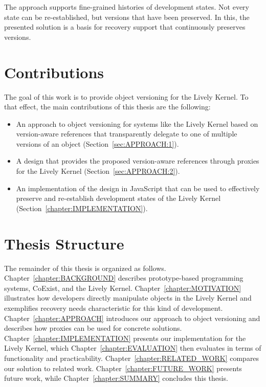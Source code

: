 The approach supports fine-grained histories of development states.
Not every state can be re-established, but versions that have been preserved.
In this, the presented solution is a basis for recovery support that continuously preserves versions.

\section{Contributions}

The goal of this work is to provide object versioning for the Lively Kernel.
To that effect, the main contributions of this thesis are the following:

\begin{itemize}
    \item An approach to object versioning for systems like the Lively Kernel based on version-aware references that transparently delegate to one of multiple versions of an object (Section~\ref{sec:APPROACH:1}).
    \item A design that provides the proposed version-aware references through proxies for the Lively Kernel (Section~\ref{sec:APPROACH:2}).
    \item An implementation of the design in JavaScript that can be used to effectively preserve and re-establish development states of the Lively Kernel (Section~\ref{chapter:IMPLEMENTATION}).
\end{itemize}


\section{Thesis Structure}

The remainder of this thesis is organized as follows. 
Chapter~\ref{chapter:BACKGROUND} describes prototype-based programming systems, CoExist, and the Lively Kernel.
Chapter~\ref{chapter:MOTIVATION} illustrates how developers directly manipulate objects in the Lively Kernel and exemplifies recovery needs characteristic for this kind of development.
Chapter~\ref{chapter:APPROACH} introduces our approach to object versioning and describes how proxies can be used for concrete solutions.
Chapter~\ref{chapter:IMPLEMENTATION} presents our implementation for the Lively Kernel, which Chapter~\ref{chapter:EVALUATION} then evaluates in terms of functionality and practicability.
Chapter~\ref{chapter:RELATED_WORK} compares our solution to related work.
Chapter~\ref{chapter:FUTURE_WORK} presents future work, while Chapter~\ref{chapter:SUMMARY} concludes this thesis.
